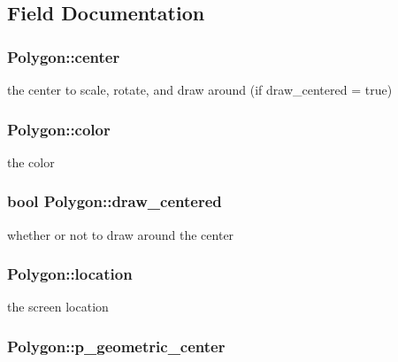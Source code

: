 \subsection{Field Documentation}
\hypertarget{struct_polygon_a69236fcce21e17cef1d2188784fbd62d}{
\subsubsection[{center}]{ Polygon\-::center}}\label{struct_polygon_a69236fcce21e17cef1d2188784fbd62d}
the center to scale, rotate, and draw around (if draw\-\_\-centered = true) \hypertarget{struct_polygon_af11748a279532cb7c86536c90d4bb98f}{
\subsubsection[{color}]{ Polygon\-::color}}\label{struct_polygon_af11748a279532cb7c86536c90d4bb98f}
the color \hypertarget{struct_polygon_ac0f4e21df930834f025d2ee652486be2}{
\subsubsection[{draw\-\_\-centered}]{\setlength{\rightskip}{0pt plus 5cm}bool Polygon\-::draw\-\_\-centered}}\label{struct_polygon_ac0f4e21df930834f025d2ee652486be2}
whether or not to draw around the center \hypertarget{struct_polygon_a843158366bab5a0ff1585eea6ae129c4}{
\subsubsection[{location}]{ Polygon\-::location}}\label{struct_polygon_a843158366bab5a0ff1585eea6ae129c4}
the screen location \hypertarget{struct_polygon_aa93cce3a1832a96829d43121993d6cc0}{
\subsubsection[{p\-\_\-geometric\-\_\-center}]{ Polygon\-::p\-\_\-geometric\-\_\-center}}\label{struct_polygon_aa93cce3a1832a96829d43121993d6cc0}
